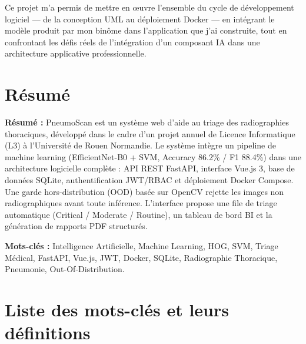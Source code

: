 \documentclass[12pt, a4paper]{report}
\begin{document}
\vspace{6pt}
Ce projet m'a permis de mettre en œuvre l'ensemble du cycle de développement
logiciel --- de la conception UML au déploiement Docker ---
en intégrant le modèle produit par mon binôme dans l'application que j'ai
construite, tout en confrontant les défis réels de l'intégration d'un composant IA
dans une architecture applicative professionnelle.

\chapter*{Résumé}

\textbf{Résumé :}
PneumoScan est un système web d'aide au triage des radiographies thoraciques,
développé dans le cadre d'un projet annuel de Licence Informatique (L3)
à l'Université de Rouen Normandie. Le système intègre un pipeline de machine
learning (EfficientNet-B0 + SVM, Accuracy 86.2\% / F1 88.4\%) dans une architecture logicielle
complète : API REST FastAPI, interface Vue.js 3, base de données SQLite,
authentification JWT/RBAC et déploiement Docker Compose. Une garde
hors-distribution (OOD) basée sur OpenCV rejette les images non radiographiques
avant toute inférence. L'interface propose une file de triage automatique
(Critical / Moderate / Routine), un tableau de bord BI et la génération
de rapports PDF structurés.

\vspace{8pt}
\noindent\textbf{Mots-clés :} Intelligence Artificielle, Machine Learning,
HOG, SVM, Triage Médical, FastAPI, Vue.js, JWT, Docker, SQLite,
Radiographie Thoracique, Pneumonie, Out-Of-Distribution.

\chapter*{Liste des mots-clés et leurs définitions}
\end{document}
